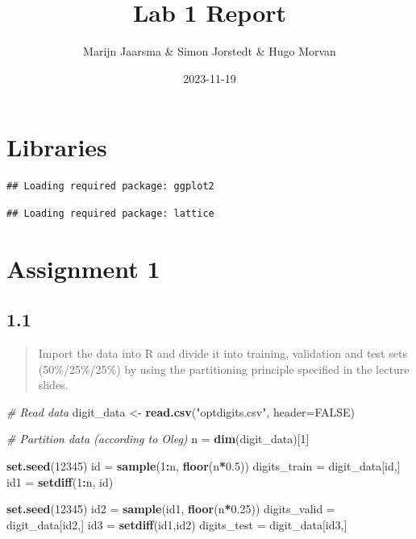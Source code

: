\documentclass[
]{article}
\title{Lab 1 Report}
\author{Marijn Jaarsma \& Simon Jorstedt \& Hugo Morvan}
\date{2023-11-19}
\newenvironment{Shaded}{\begin{snugshade}}{\end{snugshade}}
\newcommand{\AttributeTok}[1]{\textcolor[rgb]{0.13,0.29,0.53}{#1}}
\newcommand{\CommentTok}[1]{\textcolor[rgb]{0.56,0.35,0.01}{\textit{#1}}}
\newcommand{\ConstantTok}[1]{\textcolor[rgb]{0.56,0.35,0.01}{#1}}
\newcommand{\DecValTok}[1]{\textcolor[rgb]{0.00,0.00,0.81}{#1}}
\newcommand{\FloatTok}[1]{\textcolor[rgb]{0.00,0.00,0.81}{#1}}
\newcommand{\FunctionTok}[1]{\textcolor[rgb]{0.13,0.29,0.53}{\textbf{#1}}}
\newcommand{\NormalTok}[1]{#1}
\newcommand{\OtherTok}[1]{\textcolor[rgb]{0.56,0.35,0.01}{#1}}
\newcommand{\SpecialCharTok}[1]{\textcolor[rgb]{0.81,0.36,0.00}{\textbf{#1}}}
\newcommand{\StringTok}[1]{\textcolor[rgb]{0.31,0.60,0.02}{#1}}
\begin{document}
\maketitle

\hypertarget{libraries}{%
\section{Libraries}\label{libraries}}

\begin{verbatim}
## Loading required package: ggplot2
\end{verbatim}

\begin{verbatim}
## Loading required package: lattice
\end{verbatim}

\hypertarget{assignment-1}{%
\section{Assignment 1}\label{assignment-1}}

\hypertarget{section}{%
\subsection{1.1}\label{section}}

\begin{quote}
Import the data into R and divide it into training, validation and test
sets (50\%/25\%/25\%) by using the partitioning principle specified in
the lecture slides.
\end{quote}

\begin{Shaded}
\begin{Highlighting}[]
\CommentTok{\# Read data}
\NormalTok{digit\_data }\OtherTok{\textless{}{-}} \FunctionTok{read.csv}\NormalTok{(}\StringTok{"optdigits.csv"}\NormalTok{, }\AttributeTok{header=}\ConstantTok{FALSE}\NormalTok{)}

\CommentTok{\# Partition data (according to Oleg)}
\NormalTok{n }\OtherTok{=} \FunctionTok{dim}\NormalTok{(digit\_data)[}\DecValTok{1}\NormalTok{]}

\FunctionTok{set.seed}\NormalTok{(}\DecValTok{12345}\NormalTok{)}
\NormalTok{id }\OtherTok{=} \FunctionTok{sample}\NormalTok{(}\DecValTok{1}\SpecialCharTok{:}\NormalTok{n, }\FunctionTok{floor}\NormalTok{(n}\SpecialCharTok{*}\FloatTok{0.5}\NormalTok{))}
\NormalTok{digits\_train }\OtherTok{=}\NormalTok{ digit\_data[id,]}
\NormalTok{id1 }\OtherTok{=} \FunctionTok{setdiff}\NormalTok{(}\DecValTok{1}\SpecialCharTok{:}\NormalTok{n, id)}

\FunctionTok{set.seed}\NormalTok{(}\DecValTok{12345}\NormalTok{)}
\NormalTok{id2 }\OtherTok{=} \FunctionTok{sample}\NormalTok{(id1, }\FunctionTok{floor}\NormalTok{(n}\SpecialCharTok{*}\FloatTok{0.25}\NormalTok{))}
\NormalTok{digits\_valid }\OtherTok{=}\NormalTok{ digit\_data[id2,]}
\NormalTok{id3 }\OtherTok{=} \FunctionTok{setdiff}\NormalTok{(id1,id2)}
\NormalTok{digits\_test }\OtherTok{=}\NormalTok{ digit\_data[id3,]}
\end{Highlighting}
\end{Shaded}
\end{document}
